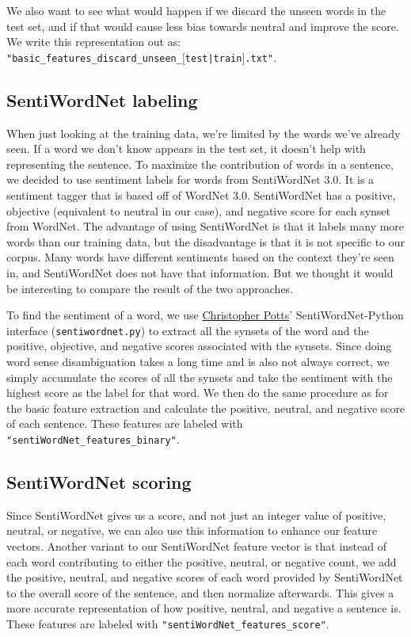 \documentclass{article}
\begin{document}
We also want to see what would happen if we discard the unseen words in the test set, and if that would cause less bias towards neutral and improve the score. We write this representation out as:\\
\texttt{"basic\_features\_discard\_unseen\_$[$test|train$]$.txt"}.

\subsection{SentiWordNet labeling}
When just looking at the training data, we're limited by the words we've already seen. If a word we don't know appears in the test set, it doesn't help with representing the sentence. To maximize the contribution of words in a sentence, we decided to use sentiment labels for words from SentiWordNet 3.0. It is a sentiment tagger that is based off of WordNet 3.0. SentiWordNet has a positive, objective (equivalent to neutral in our case), and negative score for each synset from WordNet. The advantage of using SentiWordNet is that it labels many more words than our training data, but the disadvantage is that it is not specific to our corpus. Many words have different sentiments based on the context they're seen in, and SentiWordNet does not have that information. But we thought it would be interesting to compare the result of the two approaches.

To find the sentiment of a word, we use \href{http://compprag.christopherpotts.net/wordnet.html}{Christopher Potts}' SentiWordNet-Python interface (\texttt{sentiwordnet.py}) to extract all the synsets of the word and the positive, objective, and negative scores associated with the synsets. Since doing word sense disambiguation takes a long time and is also not always correct, we simply accumulate the scores of all the synsets and take the sentiment with the highest score as the label for that word. We then do the same procedure as for the basic feature extraction and calculate the positive, neutral, and negative score of each sentence. These features are labeled with \texttt{"sentiWordNet\_features\_binary"}.

\subsection{SentiWordNet scoring}
Since SentiWordNet gives us a score, and not just an integer value of positive, neutral, or negative, we can also use this information to enhance our feature vectors. Another variant to our SentiWordNet feature vector is that instead of each word contributing to either the positive, neutral, or negative count, we add the positive, neutral, and negative scores of each word provided by SentiWordNet to the overall score of the sentence, and then normalize afterwards. This gives a more accurate representation of how positive, neutral, and negative a sentence is. These features are labeled with \texttt{"sentiWordNet\_features\_score"}.
\end{document}
